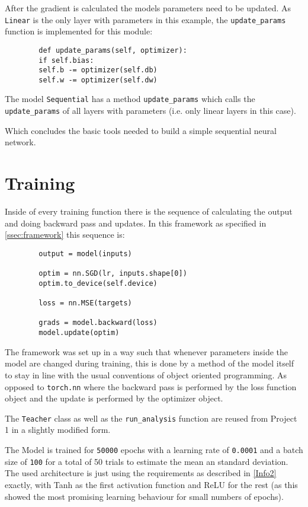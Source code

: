 \documentclass[11pt,english]{article}
\begin{document}
	After the gradient is calculated the models parameters need to be updated. As \lstinline|Linear| is the only layer with parameters in this example, the \lstinline|update_params| function is implemented for this module:
	
	\begin{lstlisting}
		def update_params(self, optimizer):
		if self.bias:
		self.b -= optimizer(self.db)
		self.w -= optimizer(self.dw)
	\end{lstlisting}
	
	The model \lstinline|Sequential| has a method \lstinline|update_params| which calls the \lstinline|update_params| of all layers with parameters (i.e. only linear layers in this case).
	
	Which concludes the basic tools needed to build a simple sequential neural network.
	
	\section{Training} \label{ssec:Training}
	
	Inside of every training function there is the sequence of calculating the output and doing backward pass and updates. In this framework as specified in \cref{ssec:framework} this sequence is:
	
	\begin{lstlisting}
		output = model(inputs)
		
		optim = nn.SGD(lr, inputs.shape[0])
		optim.to_device(self.device)
		
		loss = nn.MSE(targets)
		
		grads = model.backward(loss)
		model.update(optim)
	\end{lstlisting} 
	
	The framework was set up in a way such that whenever parameters inside the model are changed during training, this is done by a method of the model itself to stay in line with the usual conventions of object oriented programming. As opposed to \lstinline|torch.nn| where the backward pass is performed by the loss function object and the update is performed by the optimizer object.
	
	The \lstinline|Teacher| class as well as the \lstinline|run_analysis| function are reused from Project 1 in a slightly modified form.
	
	The Model is trained for \lstinline|50000| epochs with a learning rate of \lstinline|0.0001| and a batch size of \lstinline|100| for a total of 50 trials to estimate the mean an standard deviation. The used architecture is just using the requirements as described in \cref{Info2} exactly, with Tanh as the first activation function and ReLU for the rest (as this showed the most promising learning behaviour for small numbers of epochs).
	
\end{document}
